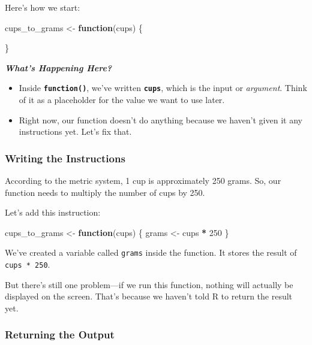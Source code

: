 \documentclass[
]{book}
\newenvironment{Shaded}{\begin{snugshade}}{\end{snugshade}}
\newcommand{\ControlFlowTok}[1]{\textcolor[rgb]{0.13,0.29,0.53}{\textbf{#1}}}
\newcommand{\DecValTok}[1]{\textcolor[rgb]{0.00,0.00,0.81}{#1}}
\newcommand{\NormalTok}[1]{#1}
\newcommand{\OtherTok}[1]{\textcolor[rgb]{0.56,0.35,0.01}{#1}}
\newcommand{\SpecialCharTok}[1]{\textcolor[rgb]{0.81,0.36,0.00}{\textbf{#1}}}
\begin{document}
Here's how we start:

\begin{Shaded}
\begin{Highlighting}[]
\NormalTok{cups\_to\_grams }\OtherTok{\textless{}{-}} \ControlFlowTok{function}\NormalTok{(cups) \{}
  
\NormalTok{\}}
\end{Highlighting}
\end{Shaded}

\textbf{\emph{What's Happening Here?}}

\begin{itemize}
\item
  Inside \textbf{\texttt{function()}}, we've written \textbf{\texttt{cups}}, which is the input or \emph{argument}. Think of it as a placeholder for the value we want to use later.
\item
  Right now, our function doesn't do anything because we haven't given it any instructions yet. Let's fix that.
\end{itemize}

\subsubsection{Writing the Instructions}\label{writing-the-instructions}

According to the metric system, 1 cup is approximately 250 grams. So, our function needs to multiply the number of cups by 250.

Let's add this instruction:

\begin{Shaded}
\begin{Highlighting}[]
\NormalTok{cups\_to\_grams }\OtherTok{\textless{}{-}} \ControlFlowTok{function}\NormalTok{(cups) \{}
\NormalTok{  grams }\OtherTok{\textless{}{-}}\NormalTok{ cups }\SpecialCharTok{*} \DecValTok{250}
\NormalTok{\}}
\end{Highlighting}
\end{Shaded}

We've created a variable called \texttt{grams} inside the function. It stores the result of \texttt{cups\ *\ 250}.

But there's still one problem---if we run this function, nothing will actually be displayed on the screen. That's because we haven't told R to return the result yet.

\subsubsection{\texorpdfstring{\textbf{Returning the Output}}{Returning the Output}}\label{returning-the-output}
\end{document}
